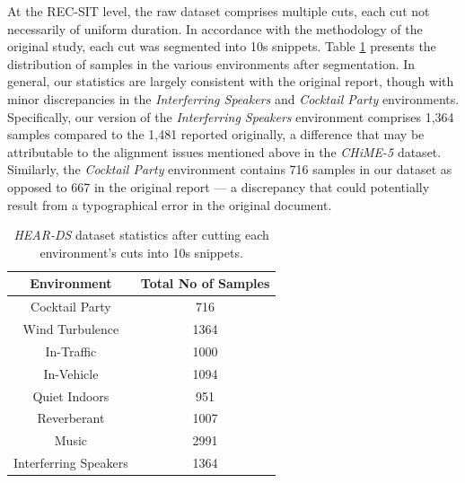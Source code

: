 \documentclass[logo,bsc,singlespacing,parskip,online]{infthesis}
\newcommand{\heards}{\textit{HEAR-DS}\xspace}
\newcommand{\chime}[1]{\textit{CHiME-#1}\xspace}
\begin{document}
At the REC-SIT level, the raw dataset comprises multiple cuts, each cut not necessarily of uniform duration.
In accordance with the methodology of the original study, each cut was segmented into 10s snippets.
Table \ref{tab:hear-ds-stats} presents the distribution of samples in the various environments after segmentation.
In general, our statistics are largely consistent with the original report, though with minor discrepancies in the \textit{Interferring Speakers} and \textit{Cocktail Party} environments.
Specifically, our version of the \textit{Interferring Speakers} environment comprises 1,364 samples compared to the 1,481 reported originally, a difference that may be attributable to the alignment issues mentioned above in the \chime{5} dataset.
Similarly, the \textit{Cocktail Party} environment contains 716 samples in our dataset as opposed to 667 in the original report — a discrepancy that could potentially result from a typographical error in the original document. 

\begin{table}[h]
   \centering
   \begin{tabular}{|c|c|}
      \hline
      Environment & Total No of Samples \\
      \hline
      Cocktail Party & 716 \\
      Wind Turbulence & 1364 \\
      In-Traffic & 1000 \\ 
      In-Vehicle & 1094 \\
      Quiet Indoors & 951 \\ 
      Reverberant & 1007 \\ 
      Music & 2991 \\
      Interferring Speakers & 1364 \\
      \hline
   \end{tabular}
   \caption{\heards dataset statistics after cutting each environment's cuts into 10s snippets.}
   \label{tab:hear-ds-stats}
\end{table}
\end{document}
